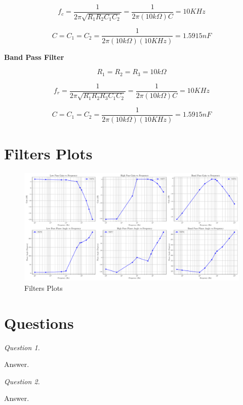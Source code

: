 \documentclass[CMPE]{KGCOEReport}
\begin{document}
\[
    f_c = \frac{1}{2\pi \sqrt{R_1R_2C_1C_2}} = \frac{1}{2\pi (10k\Omega)C} = 10 KHz
\]

\[
    C = C_1 = C_2 = \frac{1}{2\pi (10k\Omega)(10KHz)} = 1.5915 nF
\]

\textbf{Band Pass Filter}

\[
    R_1 = R_2 = R_3 = 10k\Omega
\]

\[
    f_r = \frac{1}{2\pi \sqrt{R_1R_2R_3C_1C_2}} = \frac{1}{2\pi (10k\Omega)C} = 10 KHz
\]

\[
    C = C_1 = C_2 = \frac{1}{2\pi (10k\Omega)(10KHz)} = 1.5915 nF
\]

\section*{Filters Plots} %

\begin{figure}[H]
    \centering
    \includegraphics[width=1\textwidth]{plots.pdf}
    \caption{Filters Plots}
    \label{fig:part8}
\end{figure}

\section*{Questions}

\emph{Question 1.}

Answer.

\bigskip

\emph{Question 2.}

Answer.
\end{document}
